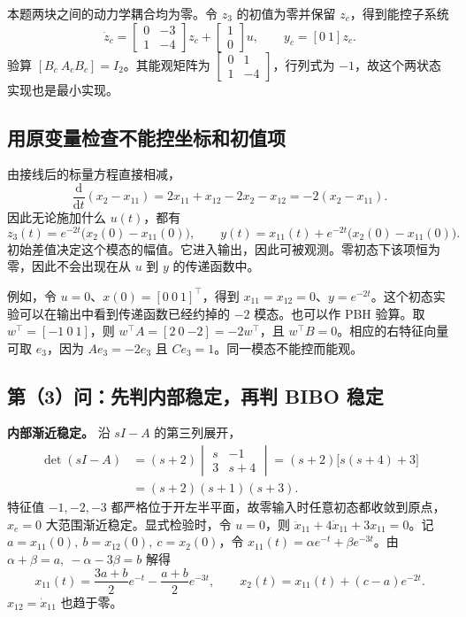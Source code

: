 本题两块之间的动力学耦合均为零。令 $z_3$ 的初值为零并保留 $z_c$，得到能控子系统
\[
    \boxed{\dot z_c=\begin{bmatrix}0&-3\\1&-4\end{bmatrix}z_c
                          +\begin{bmatrix}1\\0\end{bmatrix}u,\qquad
            y_c=[0\ 1]z_c .}
\]
验算 $[B_c\ A_cB_c]=I_2$。其能观矩阵为
$\begin{bmatrix}0&1\\1&-4\end{bmatrix}$，行列式为 $-1$，故这个两状态实现也是最小实现。

\subsection{用原变量检查不能控坐标和初值项}

由接线后的标量方程直接相减，
\[
   \frac{\mathrm d}{\mathrm dt}(x_2-x_{11})
   =2x_{11}+x_{12}-2x_2-x_{12}=-2(x_2-x_{11}).
\]
因此无论施加什么 $u(t)$，都有
\[
    z_3(t)=e^{-2t}\bigl(x_2(0)-x_{11}(0)\bigr),\qquad
    y(t)=x_{11}(t)+e^{-2t}\bigl(x_2(0)-x_{11}(0)\bigr).
\]
初始差值决定这个模态的幅值。它进入输出，因此可被观测。零初态下该项恒为零，因此不会出现在从 $u$ 到 $y$ 的传递函数中。

例如，令 $u=0$、$x(0)=[0\ 0\ 1]^\top$，得到 $x_{11}=x_{12}=0$、$y=e^{-2t}$。这个初态实验可以在输出中看到传递函数已经约掉的 $-2$ 模态。也可以作 PBH 验算。取 $w^\top=[-1\ 0\ 1]$，则
$w^\top A=[2\ 0\ {-2}]=-2w^\top$，且 $w^\top B=0$。相应的右特征向量可取 $e_3$，因为 $Ae_3=-2e_3$ 且 $Ce_3=1$。同一模态不能控而能观。

\subsection{第（3）问：先判内部稳定，再判 BIBO 稳定}

\textbf{内部渐近稳定。} 沿 $sI-A$ 的第三列展开，
\[
\begin{aligned}
    \det(sI-A)
     &= (s+2)\begin{vmatrix}s&-1\\3&s+4\end{vmatrix}
      = (s+2)\bigl[s(s+4)+3\bigr]\\
     &= (s+2)(s+1)(s+3).
\end{aligned}
\]
特征值 $-1,-2,-3$ 都严格位于开左半平面，故零输入时任意初态都收敛到原点，$x_e=0$ 大范围渐近稳定。显式检验时，令 $u=0$，则
$\ddot x_{11}+4\dot x_{11}+3x_{11}=0$。记 $a=x_{11}(0),\ b=x_{12}(0),\ c=x_2(0)$，令
$x_{11}(t)=\alpha e^{-t}+\beta e^{-3t}$。由 $\alpha+\beta=a,\ -\alpha-3\beta=b$ 解得
\[
    x_{11}(t)=\frac{3a+b}{2}e^{-t}-\frac{a+b}{2}e^{-3t},
    \qquad x_2(t)=x_{11}(t)+(c-a)e^{-2t}.
\]
$x_{12}=\dot x_{11}$ 也趋于零。


